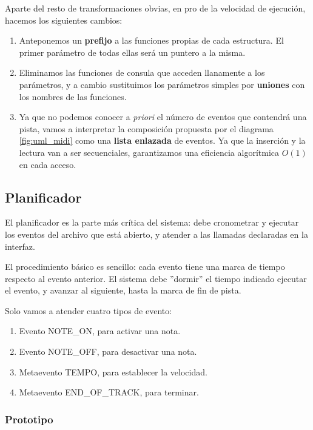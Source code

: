 Aparte del resto de transformaciones obvias, en pro de la velocidad de ejecución, hacemos los siguientes cambios:

\begin{enumerate}
	\item Anteponemos un \textbf{prefijo} a las funciones propias de cada estructura. El primer parámetro de todas ellas será un puntero a la misma.
	
	\item Eliminamos las funciones de consula que acceden llanamente a los parámetros, y a cambio sustituimos los parámetros simples por \textbf{uniones} con los nombres de las funciones.
	
	\item Ya que no podemos conocer a \textit{priori} el número de eventos que contendrá una pista, vamos a interpretar la composición propuesta por el diagrama \ref{fig:uml_midi} como una \textbf{lista enlazada} de eventos. Ya que la inserción y la lectura van a ser secuenciales, garantizamos una eficiencia algorítmica $O(1)$ en cada acceso.
\end{enumerate}

\subsection{Planificador}
\label{subsec:impl_planificador}

El planificador es la parte más crítica del sistema: debe cronometrar y ejecutar los eventos del archivo que está abierto, y atender a las llamadas declaradas en la interfaz.

El procedimiento básico es sencillo: cada evento tiene una marca de tiempo respecto al evento anterior. El sistema debe ''dormir'' el tiempo indicado ejecutar el evento, y avanzar al siguiente, hasta la marca de fin de pista.

Solo vamos a atender cuatro tipos de evento:

\begin{enumerate}
	\item Evento NOTE\_ON, para activar una nota.
	\item Evento NOTE\_OFF, para desactivar una nota.
	\item Metaevento TEMPO, para establecer la velocidad.
	\item Metaevento END\_OF\_TRACK, para terminar.
\end{enumerate}

\subsubsection{Prototipo}

